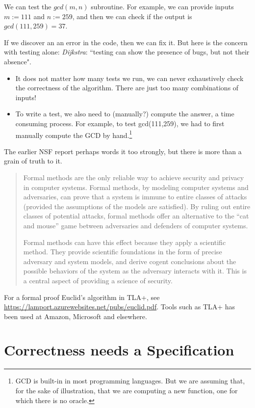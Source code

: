 \documentclass[runningheads,12pt]{article}
\begin{document}
We can test the $gcd(m,n)$ subroutine. For example, we can provide inputs $m := 111$ and $n := 259$, and then we can check if the output is $gcd(111,259) = 37$. 

If we discover an an error in the code, then we can fix it. But here is the concern with testing alone: \textit{Dijkstra}: ``testing can show the presence of bugs, but not their absence". 

\begin{itemize}
  \item It does not matter how many tests we run, we can never exhaustively check the correctness of the algorithm. There are just too many combinations of inputs!
  \item To write a test, we also need to (manually?) compute the answer, a time consuming process. For example, to test gcd(111,259), we had to first manually compute the GCD by hand.\footnote{GCD is built-in in most programming languages. But we are assuming that, for the sake of illustration, that we are computing a new function, one for which there is no oracle.}
\end{itemize}

The earlier NSF report perhaps words it too strongly, but there is more than a grain of truth to it. 

\begin{quote}
Formal methods are the only reliable way to achieve security and privacy in computer systems. Formal methods, by modeling computer systems and adversaries, can prove that a system is immune to entire classes of attacks (provided the assumptions of the models are satisfied). By ruling out entire classes of potential attacks, formal methods offer an alternative to the “cat and mouse” game between adversaries and defenders of computer systems.

Formal methods can have this effect because they apply a scientific method. They provide scientific foundations in the form of precise adversary and system models, and derive cogent conclusions about the possible behaviors of the system as the adversary interacts with it. This is a central aspect of providing a science of security.
\end{quote}

For a formal proof Euclid's algorithm in TLA+, see \url{https://lamport.azurewebsites.net/pubs/euclid.pdf}.  Tools such as TLA+ has been used at Amazon, Microsoft and elsewhere. 

\section{Correctness needs a Specification}
\end{document}
